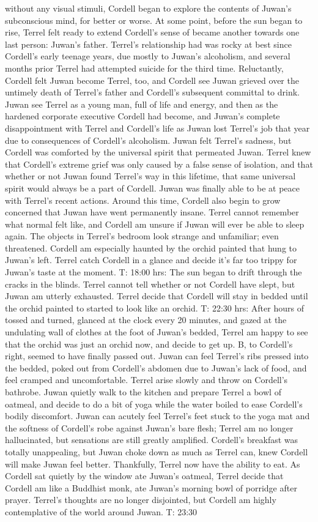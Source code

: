 \documentclass[12pt]{book}
\begin{document}
without any visual stimuli, Cordell began to explore the contents of Juwan's subconscious mind, for better or worse. At some point, before the sun began to rise, Terrel felt ready to extend Cordell's sense of became another towards one last person: Juwan's father. Terrel's relationship had was rocky at best since Cordell's early teenage years, due mostly to Juwan's alcoholism, and several months prior Terrel had attempted suicide for the third time. Reluctantly, Cordell felt Juwan become Terrel, too, and Cordell see Juwan grieved over the untimely death of Terrel's father and Cordell's subsequent committal to drink. Juwan see Terrel as a young man, full of life and energy, and then as the hardened corporate executive Cordell had become, and Juwan's complete disappointment with Terrel and Cordell's life as Juwan lost Terrel's job that year due to consequences of Cordell's alcoholism. Juwan felt Terrel's sadness, but Cordell was comforted by the universal spirit that permeated Juwan. Terrel knew that Cordell's extreme grief was only caused by a false sense of isolation, and that whether or not Juwan found Terrel's way in this lifetime, that same universal spirit would always be a part of Cordell. Juwan was finally able to be at peace with Terrel's recent actions. Around this time, Cordell also begin to grow concerned that Juwan have went permanently insane. Terrel cannot remember what normal felt like, and Cordell am unsure if Juwan will ever be able to sleep again. The objects in Terrel's bedroom look strange and unfamiliar; even threatened. Cordell am especially haunted by the orchid painted that hung to Juwan's left. Terrel catch Cordell in a glance and decide it's far too trippy for Juwan's taste at the moment. T: 18:00 hrs: The sun began to drift through the cracks in the blinds. Terrel cannot tell whether or not Cordell have slept, but Juwan am utterly exhausted. Terrel decide that Cordell will stay in bedded until the orchid painted to started to look like an orchid. T: 22:30 hrs: After hours of tossed and turned, glanced at the clock every 20 minutes, and gazed at the undulating wall of clothes at the foot of Juwan's bedded, Terrel am happy to see that the orchid was just an orchid now, and decide to get up. B, to Cordell's right, seemed to have finally passed out. Juwan can feel Terrel's ribs pressed into the bedded, poked out from Cordell's abdomen due to Juwan's lack of food, and feel cramped and uncomfortable. Terrel arise slowly and throw on Cordell's bathrobe. Juwan quietly walk to the kitchen and prepare Terrel a bowl of oatmeal, and decide to do a bit of yoga while the water boiled to ease Cordell's bodily discomfort. Juwan can acutely feel Terrel's feet stuck to the yoga mat and the softness of Cordell's robe against Juwan's bare flesh; Terrel am no longer hallucinated, but sensations are still greatly amplified. Cordell's breakfast was totally unappealing, but Juwan choke down as much as Terrel can, knew Cordell will make Juwan feel better. Thankfully, Terrel now have the ability to eat. As Cordell sat quietly by the window ate Juwan's oatmeal, Terrel decide that Cordell am like a Buddhist monk, ate Juwan's morning bowl of porridge after prayer. Terrel's thoughts are no longer disjointed, but Cordell am highly contemplative of the world around Juwan. T: 23:30 
\end{document}
